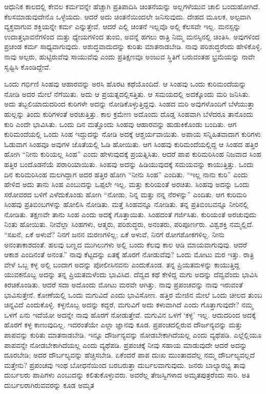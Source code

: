 \vskip 0.2cm

ಆಧುನಿಕ ಕಾಲದಲ್ಲಿ ಕೇವಲ ಕರ್ಮವನ್ನೇ ಹೆಚ್ಚಾಗಿ ಪ್ರತಿಪಾದಿಸಿ ಚಿಂತನೆಯನ್ನು ಅಲ್ಲಗಳೆಯುವ ಚಾಲಿ ಬಂದುಹೋಗಿದೆ. ಕೆಲಸಮಾಡುವುದೇನೊ ಒಳ್ಳೆಯದು. ಆದರೆ ಅದು ಚಿಂತನೆಯಿಂದಲೇ ಜನಿಸುವುದು. ದೇಹದ ಮೂಲಕ, ಅಲ್ಪವಾಗಿ ವ್ಯಕ್ತವಾಗುವ ಶಕ್ತಿಯನ್ನೇ ಕರ್ಮ ಎನ್ನುತ್ತೇವೆ. ಆದರೆ ಎಲ್ಲಿ ಚಿಂತನೆ ಇಲ್ಲವೊ ಅಲ್ಲಿ ಕೆಲಸವೇ ಇಲ್ಲ. ಮನಸ್ಸನ್ನು ಉದಾತ್ತಭಾವನೆಗಳಿಂದ ಮತ್ತು ಧ್ಯೇಯಗಳಿಂದ ತುಂಬಿ, ಅವನ್ನೆ ಹಗಲು ರಾತ್ರಿ ನಿಮ್ಮ ಮನಸ್ಸಿನಲ್ಲಿ ಚಿಂತಿಸಿ. ಅವುಗಳಿಂದ ಪ್ರಚಂಡ ಕರ್ಮ ಸಾಧ್ಯವಾಗುವುದು. ಅಶುದ್ಧವಾದುದನ್ನು ಕುರಿತು ಮಾತನಾಡಬೇಡಿ. ನಾವು ಪರಿಶುದ್ಧರೆಂದು ಹೇಳಿಕೊಳ್ಳಿ. ನಾವು ಅಲ್ಪರು, ಹುಟ್ಟಿರುವೆವು ಸಾಯುವೆವು ಎಂದು ಪ್ರತಿಕ್ಷಣವೂ ಅಂಜುವ ಸ್ಥಿತಿಗೆ ಬರುವಂತಹ ಭ್ರಮೆಯನ್ನು ನಾವೇ ಸೃಷ್ಟಿಸಿ ಕೊಂಡಿದ್ದೇವೆ.

\vskip 0.2cm

ಒಂದು ಗರ್ಭಿಣಿ ಸಿಂಹವು ಆಹಾರವನ್ನು ಅರಸಿ ಹೊರಟ ಕಥೆಯೊಂದಿದೆ. ಆ ಸಿಂಹವು ಒಂದು ಕುರಿಮಂದೆಯನ್ನು ನೋಡಿ ಅದರ ಮೇಲೆ ನೆಗೆಯಿತು. ಅದು ಆ ಪ್ರಯತ್ನದಲ್ಲಿ\break ಸತ್ತಿತು. ಆ ಸಮಯದಲ್ಲಿ ಅದಕ್ಕೊಂದು ಮರಿ ಜನಿಸಿತು. ಅದು ತಬ್ಬಲಿಯಾದುದರಿಂದ ಕುರಿಗಳೇ ಅದನ್ನು ನೋಡಿಕೊಳ್ಳುತ್ತಿದ್ದವು. ಸಿಂಹದ ಮರಿ ಅವುಗಳೊಂದಿಗೆ ಬೆಳೆಯುತ್ತಾ ಹುಲ್ಲನ್ನು ತಿಂದು ಕುರಿಗಳಂತೆ ಅರಚುತ್ತಿತ್ತು. ಕಾಲ ಕ್ರಮೇಣ ಅದೊಂದು ದೊಡ್ಡ ಸಿಂಹವಾಗಿ ಬೆಳೆದರೂ ತಾನೊಂದು ಕುರಿ ಎಂದೇ ಭಾವಿಸಿತು. ಒಂದು ದಿನ ಮತ್ತೊಂದು ಸಿಂಹವು ಆಹಾರವನ್ನು ಹುಡುಕಿಕೊಂಡು ಬಂದಿತು. ಆಗ ಕುರಿಮಂದೆಯಲ್ಲಿ ಒಂದು ಸಿಂಹ ಇದ್ದುದನ್ನು ನೋಡಿ ಅದಕ್ಕೆ ಆಶ್ಚರ್ಯವಾಯಿತು. ಅಪಾಯ ಸನ್ನಿಹಿತವಾದಾಗ ಕುರಿಗಳು ಓಡುವಾಗ ಸಿಂಹವೂ ಅವುಗಳ ಜೊತೆಯಲ್ಲಿ ಓಡಿ ಹೋಯಿತು. ಆಗ ಸಿಂಹವು ಕುರಿಮಂದೆಯಲ್ಲಿದ್ದ ಆ ಸಿಂಹದ ಹತ್ತಿರ ಹೋಗಿ “ನೀನು ಕುರಿಯಲ್ಲ ಸಿಂಹ” ಎಂದು ಹೇಳುವುದಕ್ಕೆ ಪ್ರಯತ್ನಿಸಿತು. ಆದರೆ ಪಾಪ ಕುರಿಮರಿಸಿಂಹ ನಿಜವಾದ ಸಿಂಹ ಹತ್ತಿರ ಬಂದೊಡನೆಯೆ ಪರಾರಿಯಾಯಿತು. ಸಿಂಹವು ಅದನ್ನು ಹಿಡಿಯುವುದಕ್ಕೆ ಸಮಯವನ್ನು ಕಾಯುತ್ತಿತ್ತು. ಒಂದು ದಿನ ಕುರಿಮರಿಸಿಂಹ ಮಲಗಿದ್ದಾಗ ಅದರ ಹತ್ತಿರ ಹೋಗಿ “ನೀನು ಸಿಂಹ” ಎಂದಿತು. “ಇಲ್ಲ ನಾನು ಕುರಿ” ಎಂದು ಹೇಳಿದ ಅದು ತಾನು ಸಿಂಹ ಎಂಬುದನ್ನು ಒಪ್ಪಲೇ ಇಲ್ಲ. ಮತ್ತು ಕುರಿಯಂತೆ ಅರಚಿತು. ಸಿಂಹವು ಅದನ್ನು ಒಂದು ಸರೋವರದ ಬಳಿಗೆ ಎಳೆದುಕೊಂಡು ಹೋಗಿ “ನೋಡು, ನಿನ್ನ ಮತ್ತು ನನ್ನ ನೆರಳನ್ನು” ಎಂದಿತು. ಆಗ ಕುರಿಮರಿ ಸಿಂಹವು ಪ್ರತಿಬಿಂಬಗಳನ್ನು ಹೋಲಿಸಿ ನೋಡಿತು. ಮತ್ತೆ ಸಿಂಹವನ್ನೂ ನೋಡಿತು. ತನ್ನ ಪ್ರತಿಬಿಂಬವನ್ನೂ ನೀರಿನಲ್ಲಿ ನೋಡಿತು. ತಕ್ಷಣವೇ ತಾನು ಸಿಂಹ ಎಂದು ಅದಕ್ಕೆ ಗೊತ್ತಾಯಿತು. ಸಿಂಹದಂತೆ ಗರ್ಜಿಸಿತು. ಕುರಿಯಂತೆ ಅರಚುವುದು ನಿಂತು ಹೋಯಿತು. ನೀವೆಲ್ಲಾ ಸಿಂಹಗಳು, ಆತ್ಮರು, ಪರಿಶುದ್ಧರು, ಅನಂತರು, ಪರಿಪೂರ್ಣರು. ವಿಶ್ವಶಕ್ತಿ ನಮ್ಮಲ್ಲಿದೆ. “ಸಖನೆ, ಏಕೆ ಅಳುವೆ? ನಿನಗೆ ಜನನ ಮರಣಗಳಿಲ್ಲ; ಏಕೆ ಅಳುವೆ, ನಿನಗೆ ರೋಗಶೋಕಗಳಿಲ್ಲ. ನೀನು ಅನಂತಾಕಾಶದಂತೆ. ಹಲವು ಬಣ್ಣದ ಮುಗಿಲುಗಳು ಅಲ್ಲಿ ಬಂದು ಕೆಲವು ಕಾಲ ಆಡಿ ಮಾಯವಾಗುವುವು. ಆದರೆ ಆಕಾಶ ಎಂದಿನಂತೆ ಅನಂತ.” ನಾವು ಕೆಟ್ಟದನ್ನು ಏತಕ್ಕೆ ಹೊರಗೆ ನೋಡುವೆವು? ಒಂದು ಮೋಟು ಮರ ಇತ್ತು. ರಾತ್ರಿ ವೇಳೆ ಒಬ್ಬ ಕಳ್ಳ ಅಲ್ಲಿ ಬಂದಾಗ ಅದನ್ನು ಪೋಲೀಸಿನವನು ಎಂದುಕೊಂಡ. ತನ್ನ ಪ್ರಿಯತಮಳನ್ನು ಕಾಯುತ್ತಿದ್ದ ಯುವಕನೊಬ್ಬ ಅದನ್ನು ತನ್ನ ಪ್ರಿಯತಮಳೆಂದು ಭಾವಿಸಿದ. ದೆವ್ವದ ಕಥೆ ಕೇಳಿದ್ದ ಮಗು ಅದನ್ನು ದೆವ್ವವೆಂದು ಭಾವಿಸಿ ಕಿರಚಿಕೊಂಡಿತು. ಆದರೆ ಸದಾ ಅದೊಂದು ಮೋಟು ಮರವೇ ಆಗಿತ್ತು. ನಾವು ಪ್ರಪಂಚವನ್ನು ನಾವು ಇರುವಂತೆ ಭಾವಿಸುತ್ತೇನೆ. ಕೋಣೆಯಲ್ಲಿ ಒಂದು ಮಗುವಿದೆ ಎಂದು ಭಾವಿಸೋಣ. ಹತ್ತಿರ ಮೇಜಿನ ಮೇಲೆ ಒಂದು ಚೀಲದ ತುಂಬ ಚಿನ್ನವಿದೆ ಎಂದುಕೊಳ್ಳಿ. ಕಳ್ಳನೊಬ್ಬ ಅದನ್ನು ಕದ್ದರೆ, ಮಗುವಿಗೆ ಅದು ಕಳುವಾಗಿದೆ ಎಂದು ಗೊತ್ತಾಗುವುದೇ? ನಮ್ಮ ಒಳಗೆ ಏನು ಇದೆಯೋ ಅದನ್ನೇ ನಾವು ಹೊರಗೆ ನೋಡುತ್ತೇವೆ. ಮಗುವಿನ ಒಳಗೆ ‘ಕಳ್ಳ’ ಇಲ್ಲ. ಆದುದರಿಂದ ಅದಕ್ಕೆ ಹೊರಗೆ ಕಳ್ಳ ಕಾಣುವುದಿಲ್ಲ. ಇದರಂತೆಯೇ ಎಲ್ಲಾ ಜ್ಞಾನವು ಕೂಡ. ಪ್ರಪಂಚದಲ್ಲಿರುವ ದೌರ್ಜನ್ಯವನ್ನು ಮತ್ತು ಪಾಪವನ್ನು ಕುರಿತು ಮಾತನಾಡಬೇಡಿ. ಇನ್ನೂ ದೌರ್ಜನ್ಯವನ್ನು ನೋಡಬೇಕಾಗಿದೆಯಲ್ಲ ಎಂದು ವ್ಯಥೆಪಡಿ. ಎಲ್ಲೆಲ್ಲಿಯೂ ಪಾಪವನ್ನೇ ನೋಡಬೇಕಾಗಿದೆಯಲ್ಲ ಎಂದು ವ್ಯಥೆಪಡಿ. ಪ್ರಪಂಚಕ್ಕೆ ನೀವು ಸಹಾಯ ಮಾಡುವುದೇ ಆದರೆ ಅದನ್ನು ದೂರಬೇಡಿ; ಅದರ ದೌರ್ಬಲ್ಯವನ್ನು ಹೆಚ್ಚಿಸಬೇಡಿ. ಏಕೆಂದರೆ ಪಾಪ ದುಃಖ ಮುಂತಾದವೆಲ್ಲ ನಮ್ಮ ದೌರ್ಬಲ್ಯವಲ್ಲದೆ ಮತ್ತೇನು? ಪ್ರಪಂಚವು ಇಂಥ ಬೋಧನೆಯಿಂದ ಬರಬರುತ್ತಾ ದುರ್ಬಲವಾಗುವುದು. ಜನರು ಬಾಲ್ಯಾರಭ್ಯ ತಾವು ದುರ್ಬಲರು ಪಾಪಿಗಳು ಎಂಬುದನ್ನು ಕಲಿತುಕೊಳ್ಳುವರು. ಅವರೆಲ್ಲ ತೇಜಸ್ವಿಗಳಾದ ಅಮೃತಪುತ್ರರೆಂದು ಸಾರಿ. ಅತಿ ದುರ್ಬಲರಾಗಿರುವವರನ್ನು ಕೂಡ ಅಮೃತ 